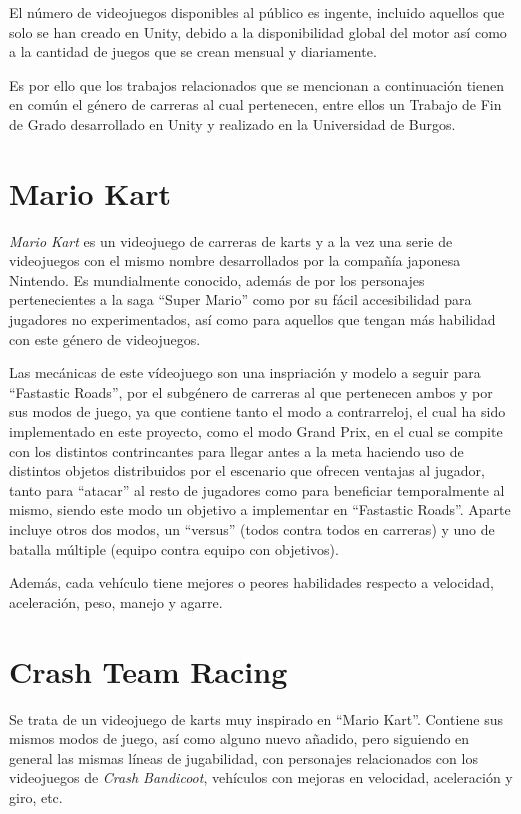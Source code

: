
El número de videojuegos disponibles al público es ingente, incluido aquellos que solo se han creado en Unity, debido a la disponibilidad global del motor así como a la cantidad de juegos que se crean mensual y diariamente.

Es por ello que los trabajos relacionados que se mencionan a continuación tienen en común el género de carreras al cual pertenecen, entre ellos un Trabajo de Fin de Grado desarrollado en Unity y realizado en la Universidad de Burgos.

\section{Mario Kart}

\textit{Mario Kart} es un videojuego de carreras de karts y a la vez una serie de videojuegos con el mismo nombre desarrollados por la compañía japonesa Nintendo. Es mundialmente conocido, además de por los personajes pertenecientes a la saga ``Super Mario'' como por su fácil accesibilidad para jugadores no experimentados, así como para aquellos que tengan más habilidad con este género de videojuegos.

Las mecánicas de este vídeojuego son una inspriación y modelo a seguir para ``Fastastic Roads'', por el subgénero de carreras al que pertenecen ambos y por sus modos de juego, ya que contiene tanto el modo a contrarreloj, el cual ha sido implementado en este proyecto, como el modo Grand Prix, en el cual se compite con los distintos contrincantes para llegar antes a la meta haciendo uso de distintos objetos distribuidos por el escenario que ofrecen ventajas al jugador, tanto para ``atacar'' al resto de jugadores como para beneficiar temporalmente al mismo, siendo este modo un objetivo a implementar en ``Fastastic Roads''. Aparte incluye otros dos modos, un ``versus'' (todos contra todos en carreras) y uno de batalla múltiple (equipo contra equipo con objetivos).

Además, cada vehículo tiene mejores o peores habilidades respecto a velocidad, aceleración, peso, manejo y agarre.

\section{Crash Team Racing}

Se trata de un videojuego de karts muy inspirado en ``Mario Kart''. Contiene sus mismos modos de juego, así como alguno nuevo añadido, pero siguiendo en general las mismas líneas de jugabilidad, con personajes relacionados con los videojuegos de \textit{Crash Bandicoot}, vehículos con mejoras en velocidad, aceleración y giro, etc.

